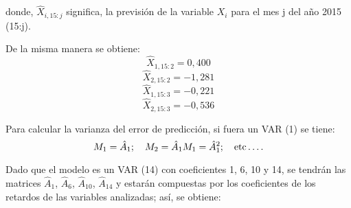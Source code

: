 \begin{enumerate}
donde, $\hat{X}_{i,15:j}$ significa, la previsi\'{o}n de la variable $X_{i}$ para el mes j del a\~{n}o 2015 (15:j).\newline

De la misma manera se obtiene:
\[
\hat{X}_{1,15:2}=0,400
\]
\[
\hat{X}_{2,15:2}=-1,281
\]
\[
\hat{X}_{1,15:3}=-0,221
\]
\[
\hat{X}_{2,15:3}=-0,536
\]

Para calcular la varianza del error de predicci\'{o}n, si fuera un VAR (1) se tiene:
\[
M_{1}=\hat{A}_{1};\quad M_{2}=\hat{A}_{1}M_{1}=\hat{A}_{1}^{2};\quad \mbox{etc}\mathellipsis.
\]

Dado que el modelo es un VAR (14) con coeficientes 1, 6, 10 y 14, se tendr\'{a}n las matrices $\hat{A}_{1}$, $\hat{A}_{6}$, $\hat{A}_{10}$, $\hat{A}_{14}$ y estar\'{a}n compuestas por los coeficientes de los retardos de las variables analizadas; as\'{i}, se obtiene:

\end{enumerate}
